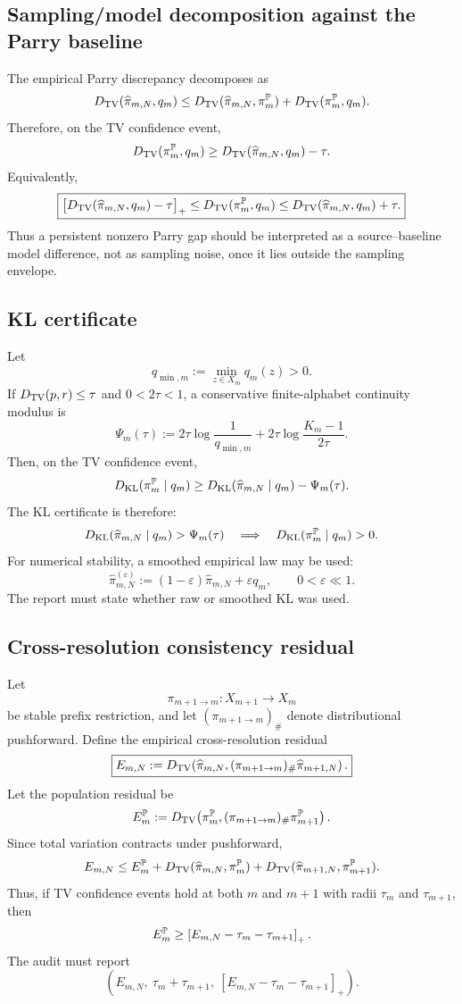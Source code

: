 \subsection{Sampling/model decomposition against the Parry baseline}

The empirical Parry discrepancy decomposes as
\[
D_{\mathrm{TV}}(\widehat\pi_{m,N},q_m)
\le
D_{\mathrm{TV}}(\widehat\pi_{m,N},\pi_m^{\mathbb{P}})
+
D_{\mathrm{TV}}(\pi_m^{\mathbb{P}},q_m).
\]
Therefore, on the TV confidence event,
\[
D_{\mathrm{TV}}(\pi_m^{\mathbb{P}},q_m)
\ge
D_{\mathrm{TV}}(\widehat\pi_{m,N},q_m)-\tau.
\]
Equivalently,
\[
\boxed{
\bigl[D_{\mathrm{TV}}(\widehat\pi_{m,N},q_m)-\tau\bigr]_+
\le
D_{\mathrm{TV}}(\pi_m^{\mathbb{P}},q_m)
\le
D_{\mathrm{TV}}(\widehat\pi_{m,N},q_m)+\tau.
}
\]
Thus a persistent nonzero Parry gap should be interpreted as a source--baseline model difference, not as sampling noise, once it lies outside the sampling envelope.

\subsection{KL certificate}

Let
\[
q_{\min,m}:=\min_{z\in X_m}q_m(z)>0.
\]
If \(D_{\mathrm{TV}}(p,r)\le\tau\) and \(0<2\tau<1\), a conservative finite-alphabet continuity modulus is
\[
\Psi_m(\tau)
:=
2\tau\log\frac1{q_{\min,m}}
+
2\tau\log\frac{K_m-1}{2\tau}.
\]
Then, on the TV confidence event,
\[
D_{\mathrm{KL}}(\pi_m^{\mathbb{P}}\mid q_m)
\ge
D_{\mathrm{KL}}(\widehat\pi_{m,N}\mid q_m)-\Psi_m(\tau).
\]
The KL certificate is therefore:
\[
D_{\mathrm{KL}}(\widehat\pi_{m,N}\mid q_m)>\Psi_m(\tau)
\quad\Longrightarrow\quad
D_{\mathrm{KL}}(\pi_m^{\mathbb{P}}\mid q_m)>0.
\]
For numerical stability, a smoothed empirical law may be used:
\[
\widehat\pi_{m,N}^{(\varepsilon)}
:=
(1-\varepsilon)\widehat\pi_{m,N}+\varepsilon q_m,
\qquad 0<\varepsilon\ll1.
\]
The report must state whether raw or smoothed KL was used.

\subsection{Cross-resolution consistency residual}

Let
\[
\pi_{m+1\to m}:X_{m+1}\to X_m
\]
be stable prefix restriction, and let \((\pi_{m+1\to m})_\#\) denote distributional pushforward.  Define the empirical cross-resolution residual
\[
\boxed{
E_{m,N}:=
D_{\mathrm{TV}}\!\left(
\widehat\pi_{m,N},
(\pi_{m+1\to m})_\#\widehat\pi_{m+1,N}
\right).
}
\]
Let the population residual be
\[
E_m^{\mathbb{P}}:=
D_{\mathrm{TV}}\!\left(
\pi_m^{\mathbb{P}},
(\pi_{m+1\to m})_\#\pi_{m+1}^{\mathbb{P}}
\right).
\]
Since total variation contracts under pushforward,
\[
E_{m,N}
\le
E_m^{\mathbb{P}}
+
D_{\mathrm{TV}}(\widehat\pi_{m,N},\pi_m^{\mathbb{P}})
+
D_{\mathrm{TV}}(\widehat\pi_{m+1,N},\pi_{m+1}^{\mathbb{P}}).
\]
Thus, if TV confidence events hold at both \(m\) and \(m+1\) with radii \(\tau_m\) and \(\tau_{m+1}\), then
\[
E_m^{\mathbb{P}}
\ge
\left[E_{m,N}-\tau_m-\tau_{m+1}\right]_+.
\]
The audit must report
\[
\left(
E_{m,N},\ \tau_m+\tau_{m+1},\
[E_{m,N}-\tau_m-\tau_{m+1}]_+
\right).
\]

